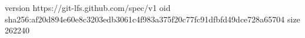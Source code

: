 version https://git-lfs.github.com/spec/v1
oid sha256:af20d894e60e8c3203edb3061c4f983a375f20c77fc91dfbfd49dce728a65704
size 262240
